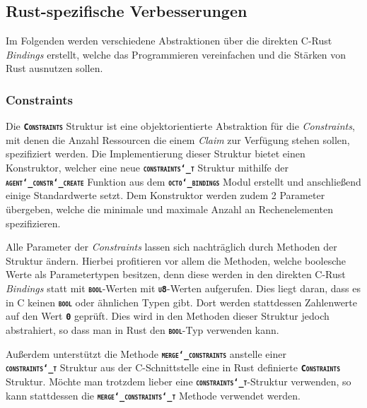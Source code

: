 \subsection{Rust-spezifische Verbesserungen}

Im Folgenden werden verschiedene Abstraktionen über die direkten C-Rust \textit{Bindings} erstellt,
welche das Programmieren vereinfachen und die Stärken von Rust ausnutzen sollen.

\subsubsection{Constraints}

Die \texttt{\textsc{\textbf{Constraints}}} Struktur ist eine
objektorientierte Abstraktion für die \textit{Constraints}, mit denen die Anzahl Ressourcen
die einem \textit{Claim} zur Verfügung stehen sollen, spezifiziert werden.
Die Implementierung dieser Struktur bietet einen Konstruktor, welcher eine neue
\texttt{\textsc{\textbf{constraints\char`_t}}} Struktur mithilfe der
\texttt{\textsc{\textbf{agent\char`_constr\char`_create}}}
Funktion aus dem \texttt{\textsc{\textbf{octo\char`_bindings}}} Modul erstellt und anschließend einige Standardwerte setzt. 
Dem Konstruktor werden zudem 2 Parameter übergeben,
welche die minimale und maximale Anzahl an Rechenelementen spezifizieren.

Alle Parameter der \textit{Constraints} lassen sich nachträglich durch Methoden der Struktur ändern.
Hierbei profitieren vor allem die Methoden, welche boolesche Werte als Parametertypen besitzen,
denn diese werden in den direkten C-Rust \textit{Bindings} statt mit \texttt{\textsc{\textbf{bool}}}-Werten mit
\texttt{\textsc{\textbf{u8}}}-Werten aufgerufen. Dies liegt daran, dass es in C keinen
\texttt{\textsc{\textbf{bool}}} oder ähnlichen Typen gibt. Dort werden stattdessen Zahlenwerte auf den
Wert \texttt{\textsc{\textbf{0}}} geprüft. Dies wird in den Methoden dieser Struktur jedoch abstrahiert,
so dass man in Rust den \texttt{\textsc{\textbf{bool}}}-Typ verwenden kann.

Außerdem unterstützt die Methode \texttt{\textsc{\textbf{merge\char`_constraints}}} anstelle einer \\
\texttt{\textsc{\textbf{constraints\char`_t}}} Struktur aus der C-Schnittstelle eine in Rust definierte
\texttt{\textsc{\textbf{Constraints}}} Struktur. Möchte man trotzdem lieber eine
\texttt{\textsc{\textbf{constraints\char`_t}}}-Struktur verwenden, so kann stattdessen die
\texttt{\textsc{\textbf{merge\char`_constraints\char`_t}}} Methode verwendet werden.

